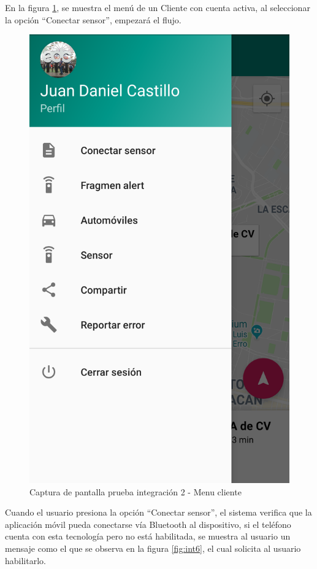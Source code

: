 En la figura \ref{fig:int5}, se muestra el menú de un Cliente con cuenta activa, al seleccionar la opción ``Conectar sensor'', empezará el flujo.

\begin{figure}[H]
	\centering
	\includegraphics[scale=.2]{Capitulo6/integracion/software/images/5}
	\caption{Captura de pantalla prueba integración 2 - Menu cliente}
	\label{fig:int5}
\end{figure}

Cuando el usuario presiona la opción ``Conectar sensor'', el sistema verifica que la aplicación móvil pueda conectarse vía Bluetooth al dispositivo, si el teléfono cuenta con esta tecnología pero no está habilitada, se muestra al usuario un mensaje como el que se observa en la figura \ref{fig:int6}, el cual solicita al usuario habilitarlo.

